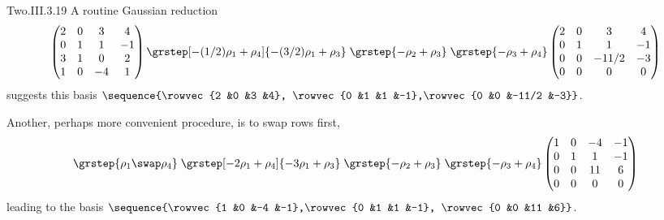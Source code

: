 \begin{ans}{Two.III.3.19}
     A routine Gaussian reduction
     \begin{equation*}
       \begin{pmatrix}
         2  &0  &3 &4   \\
         0  &1  &1  &-1 \\
         3  &1  &0  &2  \\
         1  &0  &-4  &1
       \end{pmatrix}
       \grstep[-(1/2)\rho_1+\rho_4]{-(3/2)\rho_1+\rho_3}
       \;\grstep{-\rho_2+\rho_3}
       \;\grstep{-\rho_3+\rho_4}
       \begin{pmatrix}
         2  &0  &3      &4   \\
         0  &1  &1      &-1 \\
         0  &0  &-11/2  &-3  \\
         0  &0  &0      &0
       \end{pmatrix}
     \end{equation*}
     suggests this basis
     $\sequence{\rowvec{2 &0 &3 &4},
         \rowvec{0 &1 &1 &-1},\rowvec{0 &0 &-11/2 &-3}}$.

      Another, perhaps more convenient procedure, is to swap rows first,
      \begin{equation*}
        \grstep{\rho_1\swap\rho_4}
        \;\grstep[-2\rho_1+\rho_4]{-3\rho_1+\rho_3}
        \;\grstep{-\rho_2+\rho_3}
        \;\grstep{-\rho_3+\rho_4}
        \begin{pmatrix}
           1  &0  &-4 &-1 \\
           0  &1  &1  &-1 \\
           0  &0  &11 &6  \\
           0  &0  &0  &0
         \end{pmatrix}
      \end{equation*}
      leading to the basis
      \( \sequence{\rowvec{1 &0 &-4 &-1},\rowvec{0 &1 &1 &-1},
                   \rowvec{0 &0 &11 &6}} \).
    
\end{ans}

